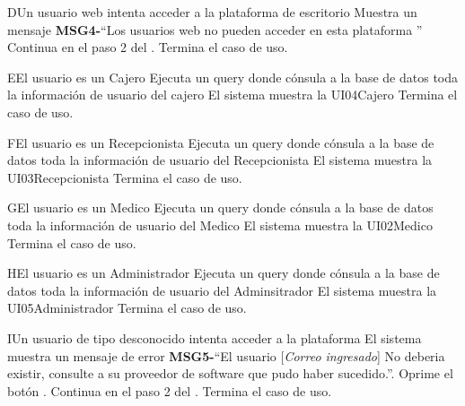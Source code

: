 \begin{UCtrayectoriaA}{D}{Un usuario web intenta acceder a la plataforma de escritorio}
\UCpaso Muestra un mensaje {\bf MSG4-}``Los usuarios web no pueden acceder en esta plataforma '' 
\UCpaso Continua en el paso 2 del .
\UCpaso[] Termina el caso de uso.
\end{UCtrayectoriaA}

\begin{UCtrayectoriaA}{E}{El usuario es un Cajero}
\UCpaso Ejecuta un query donde cónsula a la base de datos toda la información de usuario del cajero
\UCpaso El sistema muestra la UI04Cajero
\UCpaso[] Termina el caso de uso.
\end{UCtrayectoriaA}

\begin{UCtrayectoriaA}{F}{El usuario es un Recepcionista}
\UCpaso Ejecuta un query donde cónsula a la base de datos toda la información de usuario del Recepcionista
\UCpaso El sistema muestra la UI03Recepcionista
\UCpaso[] Termina el caso de uso.
\end{UCtrayectoriaA}

\begin{UCtrayectoriaA}{G}{El usuario es un Medico}
\UCpaso Ejecuta un query donde cónsula a la base de datos toda la información de usuario del Medico
\UCpaso El sistema muestra la UI02Medico
\UCpaso[] Termina el caso de uso.
\end{UCtrayectoriaA}

\begin{UCtrayectoriaA}{H}{El usuario es un Administrador}
\UCpaso Ejecuta un query donde cónsula a la base de datos toda la información de usuario del Adminsitrador
\UCpaso El sistema muestra la UI05Administrador
\UCpaso[] Termina el caso de uso.
\end{UCtrayectoriaA}

\begin{UCtrayectoriaA}{I}{Un usuario de tipo desconocido intenta acceder a la plataforma}
\UCpaso El sistema muestra un mensaje de error {\bf MSG5-}``El usuario [{\em Correo ingresado}] No deberia existir, consulte a su proveedor de software que pudo haber sucedido.''.
\UCpaso[\UCactor] Oprime el botón . 
\UCpaso Continua en el paso 2 del . 
\UCpaso[] Termina el caso de uso.
\end{UCtrayectoriaA}

